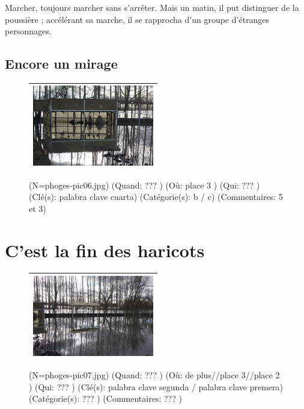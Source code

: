 \documentclass[12pt,twocolumn,french]{article}
\begin{document}
Marcher, toujours marcher sans s'arrêter. Mais un matin, il put distinguer de la poussière ; accélérant sa marche, il se rapprocha d'un groupe d'étranges personnages.

%
\subsection{ Encore un mirage}
%
  \begin{figure}[H]
    \caption{
       (N=phoges-pic06.jpg)
       (Quand: ??? )
       (Où:  place 3 )
       (Qui: ??? )
       (Clé(s): palabra clave cuarta)
       (Catégorie(s): b / c)
       (Commentaires: 5 et 3)
    }
    \vspace{4mm}
    \label{phoges-pic06.jpg}
    \noindent \centering{}
    \begin{tabular}{|c|}
      \hline
          \includegraphics[origin=c,angle=0]{phoges-pic06.jpg}
        \tabularnewline \hline
    \end{tabular}
  \end{figure}
%
\section{ C'est la fin des haricots}
%
  \begin{figure}[H]
    \caption{
       (N=phoges-pic07.jpg)
       (Quand: ??? )
       (Où:  de plus//place 3//place 2 )
       (Qui: ??? )
       (Clé(s): palabra clave segunda / palabra clave premera)
       (Catégorie(s): ??? )
       (Commentaires: ??? )
    }
    \vspace{4mm}
    \label{phoges-pic07.jpg}
    \noindent \centering{}
    \begin{tabular}{|c|}
      \hline
          \includegraphics[origin=c,angle=0]{phoges-pic07.jpg}
        \tabularnewline \hline
    \end{tabular}
  \end{figure}
%
\end{document}
